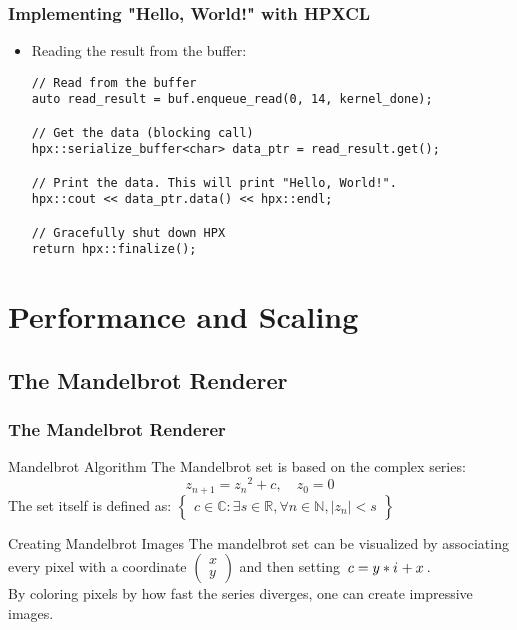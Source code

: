 \documentclass{beamer}
\begin{document}
\begin{frame}[fragile]
    \frametitle{Implementing "Hello, World!" with HPXCL}
    \begin{itemize}
        \item Reading the result from the buffer:
        \begin{lstlisting}[firstnumber=81]
// Read from the buffer
auto read_result = buf.enqueue_read(0, 14, kernel_done);

// Get the data (blocking call)
hpx::serialize_buffer<char> data_ptr = read_result.get();

// Print the data. This will print "Hello, World!".
hpx::cout << data_ptr.data() << hpx::endl;

// Gracefully shut down HPX
return hpx::finalize();
        \end{lstlisting}
    \end{itemize}
\end{frame}



\section{Performance and Scaling}

\newcommand{\iu}{{\mathnormal{i}\mkern1mu}}
\subsection{The Mandelbrot Renderer} %
\begin{frame}
    \frametitle{The Mandelbrot Renderer}
    \begin{block}{Mandelbrot Algorithm}
        The Mandelbrot set is based on the complex series:\\
        $$z_{n+1} = {z_n}^2 + c, \quad  z_0 = 0$$
    The set itself is defined as:
    $\begin{Bmatrix}c \in \mathbb{C}: \exists s \in \mathbb{R}, \forall n \in \mathbb{N},
                    |z_n| < s\end{Bmatrix}$\\
    \end{block}
    \begin{block}{Creating Mandelbrot Images}
        The mandelbrot set can be visualized by associating every pixel with
        a coordinate $\begin{pmatrix}x\\y\end{pmatrix}$ and then setting 
        $\,c = y * \iu + x\,$.
        \\
        By coloring pixels by how fast the series diverges, one can create
        impressive images.
    \end{block}
\end{frame}
\end{document}
